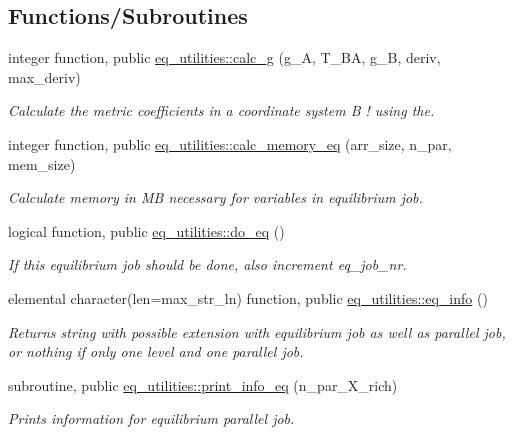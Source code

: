 \subsection*{Functions/\+Subroutines}
\begin{DoxyCompactItemize}
\item 
integer function, public \hyperlink{namespaceeq__utilities_a1426f7226577f8719472265fd882fbf4}{eq\+\_\+utilities\+::calc\+\_\+g} (g\+\_\+A, T\+\_\+\+BA, g\+\_\+B, deriv, max\+\_\+deriv)
\begin{DoxyCompactList}\small\item\em Calculate the metric coefficients in a coordinate system B ! using the. \end{DoxyCompactList}\item 
integer function, public \hyperlink{namespaceeq__utilities_a5a9f230ed9a6e627e31e882e9f4a00a1}{eq\+\_\+utilities\+::calc\+\_\+memory\+\_\+eq} (arr\+\_\+size, n\+\_\+par, mem\+\_\+size)
\begin{DoxyCompactList}\small\item\em Calculate memory in MB necessary for variables in equilibrium job. \end{DoxyCompactList}\item 
logical function, public \hyperlink{namespaceeq__utilities_a5109472305101af3a15e8e8717c426fd}{eq\+\_\+utilities\+::do\+\_\+eq} ()
\begin{DoxyCompactList}\small\item\em If this equilibrium job should be done, also increment {\ttfamily eq\+\_\+job\+\_\+nr}. \end{DoxyCompactList}\item 
elemental character(len=max\+\_\+str\+\_\+ln) function, public \hyperlink{namespaceeq__utilities_a34c5ddab45a54a6c738e5e0b8c7d55d6}{eq\+\_\+utilities\+::eq\+\_\+info} ()
\begin{DoxyCompactList}\small\item\em Returns string with possible extension with equilibrium job as well as parallel job, or nothing if only one level and one parallel job. \end{DoxyCompactList}\item 
subroutine, public \hyperlink{namespaceeq__utilities_a40f397d20b45432117744ca16870ddbb}{eq\+\_\+utilities\+::print\+\_\+info\+\_\+eq} (n\+\_\+par\+\_\+\+X\+\_\+rich)
\begin{DoxyCompactList}\small\item\em Prints information for equilibrium parallel job. \end{DoxyCompactList}\end{DoxyCompactItemize}
